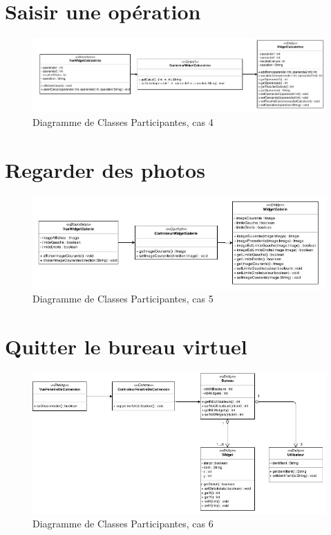 
\section{Saisir une opération}
\noindent\begin{figure}[H]
	\centering
	\includegraphics[angle=90,scale=0.9]{diagrammes/DCP4.jpg}
	\caption{Diagramme de Classes Participantes, cas 4}
\end{figure}

\section{Regarder des photos}
\begin{figure}[H]
	\centering
	\includegraphics[angle=90]{diagrammes/DCP5.jpg}
	\caption{Diagramme de Classes Participantes, cas 5}
\end{figure}

\section{Quitter le bureau virtuel}

\begin{figure}[H]
	\centering
	\includegraphics[angle=90]{diagrammes/DCP6.jpg}
	\caption{Diagramme de Classes Participantes, cas 6}
\end{figure}